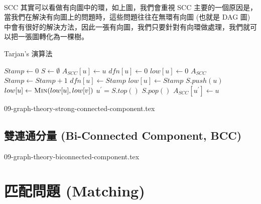 \documentclass[12pt,a4paper,oneside]{report}
\begin{document}
\begin{CJK}{UTF8}{bkai}
\paragraph{}SCC 其實可以看做有向圖中的環，如上圖，我們會重視 SCC 主要的一個原因是，當我們在解決有向圖上的問題時，這些問題往往在無環有向圖 (也就是 DAG 圖) 中會有很好的解決方法，因此一張有向圖，我們只要針對有向環做處理，我們就可以把一張圖轉化為一棵樹。

\begin{algorithm}
  \caption{Tarjan's 演算法}
  \label{algo:scc_tarjan}
  \begin{algorithmic}[1]
    \State $Stamp\gets{0}$
    \State $S\gets{\emptyset}$
      \State $A_{SCC}[u]\gets{u}$
      \State $dfn[u]\gets{0}$
      \State $low[u]\gets{0}$
    \EndFor
        \State {}
      \EndIf
    \EndFor
    \State \Return $A_{SCC}$
  \EndProcedure
  \State {}
    \State $Stamp\gets{Stamp+1}$
    \State $dfn[u]\gets{Stamp}$
    \State $low[u]\gets{Stamp}$
    \State $S.push(u)$
        \State {}
      \EndIf
        \State $low[u]\gets{\Call{Min}{low[u],low[v]}}$
      \EndIf
    \EndFor
      \Repeat
        \State $u^{'}=S.top()$
        \State $S.pop()$
        \State $A_{SCC}[u^{'}]\gets{u}$
    \EndIf
  \EndProcedure
  \end{algorithmic}
\end{algorithm}

{09-graph-theory-strong-connected-component.tex}

\subsection{雙連通分量 (Bi-Connected Component, BCC)}

{09-graph-theory-biconnected-component.tex}

\section{匹配問題 (Matching)}


\end{CJK}
\end{document}
